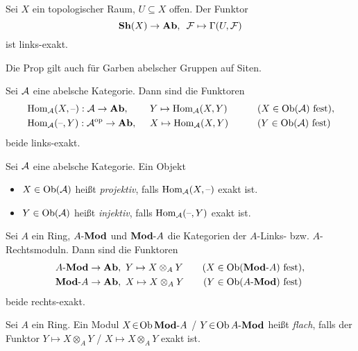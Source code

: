 \documentclass{cheat-sheet}
\newcommand{\Fais}{\mathcal{F}} %
\newcommand{\AMod}{\text{$A$-$\Mod$}} %
\newcommand{\ModA}{\text{$\Mod$-$A$}} %
\begin{document}
\begin{prop}
  Sei $X$ ein topologischer Raum, $U \subseteq X$ offen. Der Funktor
  \[ \Sh(X) \to \AbGrp, \enspace \Fais \mapsto \Gamma(U, \Fais) \]
  ist links-exakt.
\end{prop}

\begin{bem}
  Die Prop gilt auch für Garben abelscher Gruppen auf Siten.
\end{bem}

\begin{prop}
  Sei $\mathcal{A}$ eine abelsche Kategorie. Dann sind die Funktoren
  \begin{alignat*}{5}
    & \operatorname{Hom}_{\mathcal{A}}(X, \text{--}) : \mathcal{A} \to \mathbf{Ab}, \enspace && Y \mapsto \operatorname{Hom}_{\mathcal{A}}(X, Y) \qquad && \text{($X \in \operatorname{Ob}(\mathcal{A})$ fest)}, \\
    & \operatorname{Hom}_{\mathcal{A}}(\text{--}, Y) : \mathcal{A}^{\mathrm{op}} \to \mathbf{Ab}, \enspace && X \mapsto \operatorname{Hom}_{\mathcal{A}}(X, Y) \qquad && \text{($Y \in \operatorname{Ob}(\mathcal{A})$ fest)}
  \end{alignat*}
  beide links-exakt.
\end{prop}

\begin{defn}
  Sei $\mathcal{A}$ eine abelsche Kategorie. Ein Objekt
  \begin{itemize}
    \item $X \in \operatorname{Ob}(\mathcal{A})$ heißt \emph{projektiv}, falls $\operatorname{Hom}_{\mathcal{A}}(X, \text{--})$ exakt ist.
    \item $Y \in \operatorname{Ob}(\mathcal{A})$ heißt \emph{injektiv}, falls $\operatorname{Hom}_{\mathcal{A}}(\text{--}, Y)$ exakt ist.
  \end{itemize}
\end{defn}

\begin{prop}
  Sei $A$ ein Ring, $\AMod$ und $\ModA$ die Kategorien der $A$-Links- bzw. $A$-Rechtsmoduln.
  Dann sind die Funktoren
  \begin{align*}
    \AMod \to \AbGrp, \enspace & Y \mapsto X \otimes_A Y \qquad \text{($X \in \Ob(\ModA)$ fest)}, \\
    \ModA \to \AbGrp, \enspace & X \mapsto X \otimes_A Y \qquad \text{($Y \in \Ob(\AMod)$ fest)}
  \end{align*}
  beide rechts-exakt.
\end{prop}

\begin{defn}
  Sei $A$ ein Ring. Ein Modul $X \!\in\! \Ob \ModA$ / $Y \!\in\! \Ob \AMod$
  heißt \emph{flach}, falls der Funktor $Y \mapsto X \otimes_A Y$ / $X \mapsto X \otimes_A Y$ exakt ist.
\end{defn}
\end{document}
